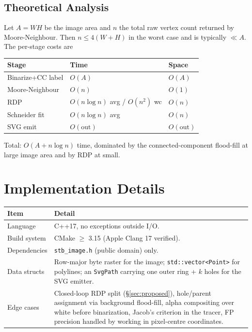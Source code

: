 \documentclass[twocolumn,a4paper,10pt]{article}
\begin{document}
\subsection{Theoretical Analysis}
Let $A=WH$ be the image area and $n$ the total raw vertex count
returned by Moore-Neighbour.  Then $n \le 4(W+H)$ in the worst case
and is typically $\ll A$.  The per-stage costs are
\begin{center}
\begin{tabular}{@{}lll@{}}
\toprule
Stage           & Time                & Space \\ \midrule
Binarize+CC label  & $O(A)$            & $O(A)$ \\
Moore-Neighbour    & $O(n)$            & $O(1)$ \\
RDP                & $O(n\log n)$ avg / $O(n^2)$ wc & $O(n)$ \\
Schneider fit      & $O(n\log n)$ avg  & $O(n)$ \\
SVG emit           & $O(\text{out})$   & $O(\text{out})$ \\ \bottomrule
\end{tabular}
\end{center}
Total: $O(A + n\log n)$ time, dominated by the connected-component
flood-fill at large image area and by RDP at small.

\section{Implementation Details}
\label{sec:impl}

\noindent\begin{tabular}{@{}lp{}@{}}
\toprule
Item & Detail \\ \midrule
Language     & C++17, no exceptions outside I/O. \\
Build system & CMake $\geq$ 3.15 (Apple Clang 17 verified). \\
Dependencies & \texttt{stb\_image.h} (public domain) only. \\
Data structs & Row-major byte raster for the image; \texttt{std::vector<Point>}
               for polylines; an \texttt{SvgPath} carrying one outer ring +
               $k$ holes for the SVG emitter. \\
Edge cases   & Closed-loop RDP split (\S\ref{sec:proposed}), hole/parent
               assignment via background flood-fill, alpha compositing
               over white before binarization, Jacob's criterion in the
               tracer, FP precision handled by working in pixel-centre
               coordinates. \\ \bottomrule
\end{tabular}
\end{document}

